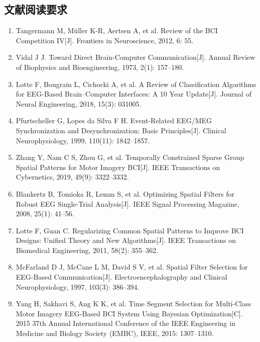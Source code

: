 \documentclass[12pt,a4paper]{ctexart}
\begin{document}
\subsection*{文献阅读要求}


\begin{enumerate}
  \item Tangermann M, Müller K-R, Aertsen A, et al. Review of the BCI Competition IV[J]. Frontiers in Neuroscience, 2012, 6: 55.
  \item Vidal J J. Toward Direct Brain-Computer Communication[J]. Annual Review of Biophysics and Bioengineering, 1973, 2(1): 157--180.
  \item Lotte F, Bougrain L, Cichocki A, et al. A Review of Classification Algorithms for EEG-Based Brain--Computer Interfaces: A 10 Year Update[J]. Journal of Neural Engineering, 2018, 15(3): 031005.
  \item Pfurtscheller G, Lopes da Silva F H. Event-Related EEG/MEG Synchronization and Desynchronization: Basic Principles[J]. Clinical Neurophysiology, 1999, 110(11): 1842--1857.
  \item Zhang Y, Nam C S, Zhou G, et al. Temporally Constrained Sparse Group Spatial Patterns for Motor Imagery BCI[J]. IEEE Transactions on Cybernetics, 2019, 49(9): 3322--3332.
  \item Blankertz B, Tomioka R, Lemm S, et al. Optimizing Spatial Filters for Robust EEG Single-Trial Analysis[J]. IEEE Signal Processing Magazine, 2008, 25(1): 41--56.
  \item Lotte F, Guan C. Regularizing Common Spatial Patterns to Improve BCI Designs: Unified Theory and New Algorithms[J]. IEEE Transactions on Biomedical Engineering, 2011, 58(2): 355--362.
  \item McFarland D J, McCane L M, David S V, et al. Spatial Filter Selection for EEG-Based Communication[J]. Electroencephalography and Clinical Neurophysiology, 1997, 103(3): 386--394.
  \item Yang H, Sakhavi S, Ang K K, et al. Time Segment Selection for Multi-Class Motor Imagery EEG-Based BCI System Using Bayesian Optimization[C]. 2015 37th Annual International Conference of the IEEE Engineering in Medicine and Biology Society (EMBC), IEEE, 2015: 1307--1310.

\end{enumerate}
\end{document}
